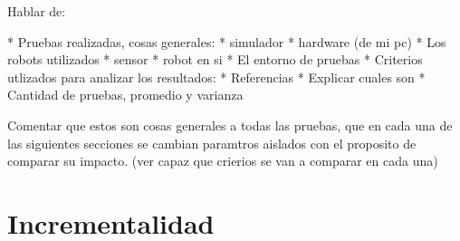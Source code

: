 Hablar de:

* Pruebas realizadas, cosas generales:
  * simulador
  * hardware (de mi pc)
  * Los robots utilizados
    * sensor 
    * robot en si
  * El entorno de pruebas
  * Criterios utlizados para analizar los resultados: 
    * Referencias
    * Explicar cuales son
  * Cantidad de pruebas, promedio y varianza

Comentar que estos son cosas generales a todas las pruebas, que en cada una de
las siguientes secciones se cambian paramtros aislados con el proposito de
comparar su impacto. (ver capaz que crierios se van a comparar en cada una)

\section{Incrementalidad}

